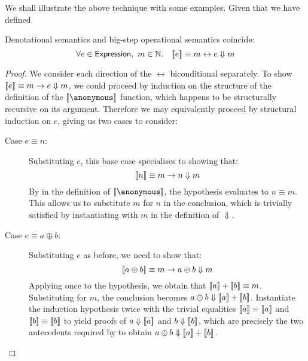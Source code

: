 We shall illustrate the above technique with some examples. Given that we
have defined 

\begin{theorem}
Denotational semantics and big-step operational semantics coincide:
\[
	\forall e \in \Expression,\ m \in \Nat.\quad
		\sb[e] \equiv m \leftrightarrow e \Downarrow m
\]
\end{theorem}

\begin{proof}
We consider each direction of the $\leftrightarrow$ biconditional
separately. To show $\sb[e] \equiv m \rightarrow e \Downarrow m$, we could
proceed by induction on the structure of the definition of the
$\sb[\anonymous]$ function, which happens to be structurally recursive on
its argument. Therefore we may equivalently proceed by structural induction
on $e$, giving us two cases to consider:
\begin{description}
\item[Case $e \equiv n$:]%
Substituting $e$, this base case specialises to showing that:
\[
	\sb[n] \equiv m \rightarrow n \Downarrow m
\]
By  in the definition of $\sb[\anonymous]$, the
hypothesis evaluates to $n \equiv m$. This allows us to substitute $m$ for
$n$ in the conclusion, which is trivially satisfied by instantiating
 with $m$ in the definition of ${\Downarrow}$.
\item[Case $e \equiv a \oplus b$:]%
Substituting $e$ as before, we need to show that:
\[
	\sb[a \oplus b] \equiv m \rightarrow a \oplus b \Downarrow m
\]
Applying  once to the hypothesis, we obtain that $\sb[a]
+ \sb[b] \equiv m$. Substituting for $m$, the conclusion becomes $a \oplus
b \Downarrow \sb[a] + \sb[b]$. Instantiate the induction hypothesis twice
with the trivial equalities $\sb[a] \equiv \sb[a]$ and $\sb[b] \equiv
\sb[b]$ to yield proofs of $a \Downarrow \sb[a]$ and $b \Downarrow \sb[b]$,
which are precisely the two antecedents required by  to
obtain $a \oplus b \Downarrow \sb[a] + \sb [b]$.
\end{description}


\end{proof}
